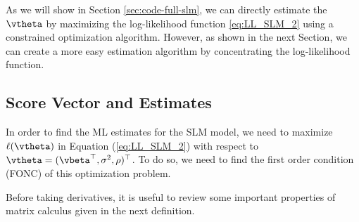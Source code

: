 \documentclass[english,12pt]{book}\usepackage[]{graphicx}\usepackage[]{xcolor}
\begin{document}
As we will show in Section \ref{sec:code-full-slm}, we can directly estimate the $\vtheta$ by maximizing the log-likelihood function \eqref{eq:LL_SLM_2} using a constrained optimization algorithm. However, as shown in the next Section, we can create a more easy estimation algorithm by concentrating the log-likelihood function. 

\subsection{Score Vector and Estimates}\label{sec:score_sml}

In order to find the ML estimates for the SLM model, we need to maximize $\ell(\vtheta)$ in Equation (\ref{eq:LL_SLM_2}) with respect to $\vtheta = (\vbeta^\top, \sigma^2 , \rho)^\top$. To do so, we need to find the first order condition (FONC) of this optimization problem. 

Before taking derivatives, it is useful to review some important properties of matrix calculus given in the next definition. 
\end{document}

